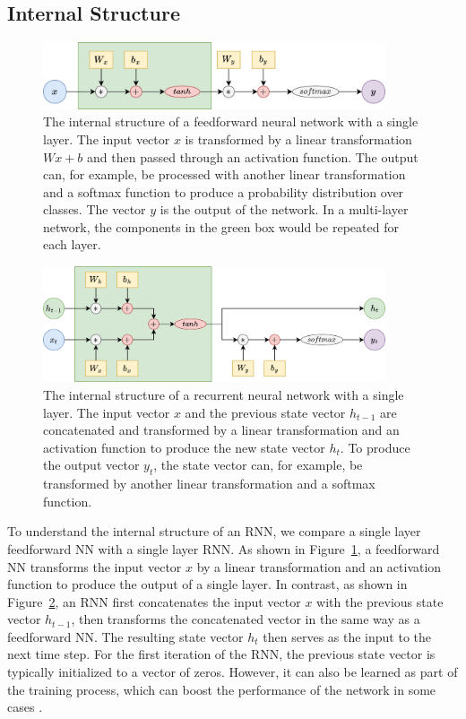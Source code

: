 \documentclass{article}
\newcommand{\reffig}[1]{Figure~\ref{#1}}
\begin{document}
\subsection{Internal Structure}
\label{sec:2.1}

\begin{figure}[htbp]
  \centering
  \includegraphics[width=0.9\textwidth]{Block Diagram Feedforward.drawio.png}
  \caption{The internal structure of a feedforward neural network with a single layer. The
    input vector $x$ is transformed by a linear transformation $Wx + b$ and then passed
    through an activation function. The output can, for example, be processed with another
    linear transformation and a softmax function to produce a probability distribution
    over classes. The vector $y$ is the output of the network. In a multi-layer network,
    the components in the green box would be repeated for each layer.}
  \label{fig:internal-feedforward}
\end{figure}

\begin{figure}[htbp]
  \centering
  \includegraphics[width=0.9\textwidth]{Block Diagram RNN.drawio.png}
  \caption{The internal structure of a recurrent neural network with a single layer. The
    input vector $x$ and the previous state vector $h_{t-1}$ are concatenated and
    transformed by a linear transformation and an activation function to produce the new
    state vector $h_t$. To produce the output vector $y_t$, the state vector can, for
    example, be transformed by another linear transformation and a softmax function.}
  \label{fig:internal-rnn}
\end{figure}

To understand the internal structure of an RNN, we compare a single layer feedforward NN
with a single layer RNN. As shown in \reffig{fig:internal-feedforward}, a feedforward NN
transforms the input vector $x$ by a linear transformation and an activation function to
produce the output of a single layer. In contrast, as shown in \reffig{fig:internal-rnn},
an RNN first concatenates the input vector $x$ with the previous state vector $h_{t-1}$,
then transforms the concatenated vector in the same way as a feedforward NN. The resulting
state vector $h_t$ then serves as the input to the next time step. For the first iteration
of the RNN, the previous state vector is typically initialized to a vector of zeros.
However, it can also be learned as part of the training process, which can boost the
performance of the network in some cases
\cite{sutskeverImportanceInitializationMomentum2013}.
\end{document}

